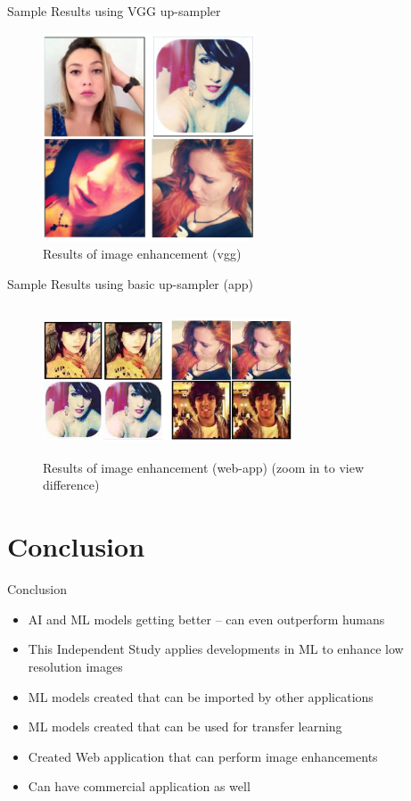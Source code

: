 \documentclass{beamer}
\begin{document}
	\begin{frame}{Sample Results using VGG up-sampler}
		\begin{figure}[htbp]
			\centerline{\includegraphics[width=17em]{res_vgg.png}}
			\caption{Results of image enhancement (vgg)}
			\label{res-fig}
		\end{figure}
	\end{frame}

	\begin{frame}{Sample Results using basic up-sampler (app)}
	\begin{figure}[htbp]
		\centerline{\includegraphics[height=12em, width=20em]{res_2.png}}
		\caption{Results of image enhancement (web-app) (zoom in to view difference)}
		\label{res2-fig}
	\end{figure}
\end{frame}


\section{Conclusion}
	\begin{frame}{Conclusion}
		\begin{itemize}
			\item AI and ML models getting better -- can even outperform humans
			\item This Independent Study applies developments in ML to enhance low resolution images
			\item ML models created that can be imported by other applications
			\item ML models created that can be used for transfer learning
			\item Created Web application that can perform image enhancements
			\item Can have commercial application as well
		\end{itemize}
	\end{frame}
\end{document}
